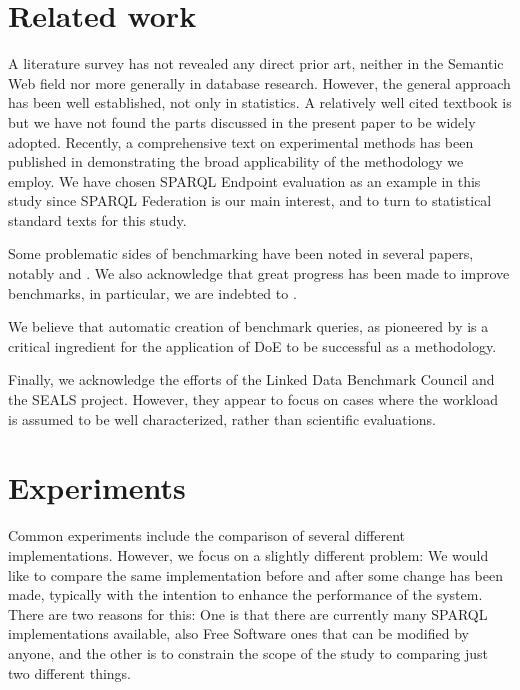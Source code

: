 \documentclass{llncs}
\begin{document}
\section{Related work}

A literature survey has not revealed any direct prior art, neither in
the Semantic Web field nor more generally in database research. However, the
general approach has been well established, not only in statistics. A
relatively well cited textbook is \cite{citeulike:5190414} but we have
not found the parts discussed in the present paper to be widely
adopted. Recently, a comprehensive text on experimental methods has
been published in
\cite{Springer-2010-Experimental-Methods-for-the-Analysis-of-Optimization-Algorithms}
demonstrating the broad applicability of the methodology we employ.
We have chosen SPARQL Endpoint evaluation as an example in this study
since SPARQL Federation is our main interest, and to turn to
statistical standard texts \cite{wu2009experiments} for this study.

Some problematic sides of benchmarking have been noted in several
papers, notably \cite{Duan:2011:AOC:1989323.1989340} and
\cite{MontoyaVCRA12}. We also acknowledge that great progress has been
made to improve benchmarks, in particular, we are indebted to
\cite{mxro:Morsey2011DBpedia}.

We believe that automatic creation of benchmark queries, as pioneered
by \cite{goerlitz2012splodge} is a critical ingredient for the
application of DoE to be successful as a methodology.

Finally, we acknowledge the efforts of the Linked Data Benchmark
Council and the SEALS project. However, they appear to focus on cases
where the workload is assumed to be well characterized, rather than
scientific evaluations.


\section{Experiments}

Common experiments include the comparison of several different
implementations. However, we focus on a slightly different problem: We
would like to compare the same implementation before and after some
change has been made, typically with the intention to enhance the
performance of the system. There are two reasons for this: One is that
there are currently many SPARQL implementations available, also Free
Software ones that can be modified by anyone, and the other is to
constrain the scope of the study to comparing just two different
things.
\end{document}
